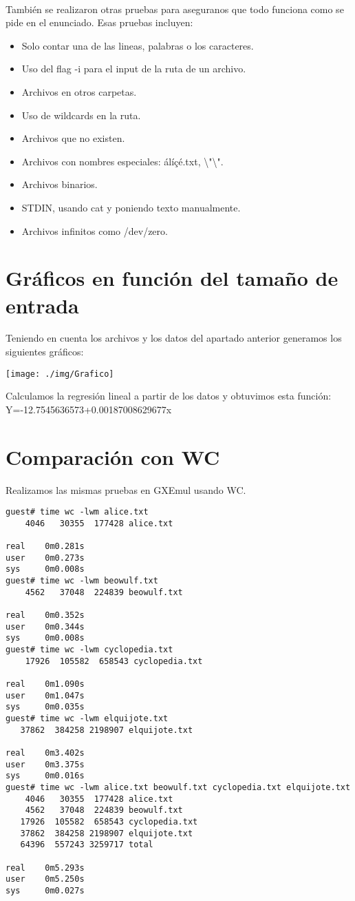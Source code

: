 \documentclass[a4paper]{article}
\begin{document}
\paragraph{}
También se realizaron otras pruebas para aseguranos que todo funciona como se pide en el enunciado. Esas pruebas incluyen:
\begin{itemize}
\item Solo contar una de las lineas, palabras o los caracteres.
\item Uso del flag -i para el input de la ruta de un archivo.
\item Archivos en otros carpetas.
\item Uso de wildcards en la ruta.
\item Archivos que no existen.
\item Archivos con nombres especiales: álíçé.txt, \textbackslash{}"\textbackslash{}".
\item Archivos binarios.
\item STDIN, usando cat y poniendo texto manualmente.
\item Archivos infinitos como /dev/zero.


\end{itemize}
\pagebreak
\section{Gráficos en función del tamaño de entrada}
Teniendo en cuenta los archivos y los datos del apartado anterior generamos los siguientes gráficos:

\texttt{[image: ./img/Grafico]}

Calculamos la regresión lineal a partir de los datos y obtuvimos esta función:  Y=-12.7545636573+0.00187008629677x

\pagebreak

\section{Comparación con WC}
Realizamos las mismas pruebas en GXEmul usando WC.

\begin{verbatim}
guest# time wc -lwm alice.txt
	4046   30355  177428 alice.txt

real    0m0.281s
user    0m0.273s
sys     0m0.008s
guest# time wc -lwm beowulf.txt
    4562   37048  224839 beowulf.txt

real    0m0.352s
user    0m0.344s
sys     0m0.008s
guest# time wc -lwm cyclopedia.txt
	17926  105582  658543 cyclopedia.txt

real    0m1.090s
user    0m1.047s
sys     0m0.035s
guest# time wc -lwm elquijote.txt
   37862  384258 2198907 elquijote.txt

real    0m3.402s
user    0m3.375s
sys     0m0.016s
guest# time wc -lwm alice.txt beowulf.txt cyclopedia.txt elquijote.txt
    4046   30355  177428 alice.txt
    4562   37048  224839 beowulf.txt
   17926  105582  658543 cyclopedia.txt
   37862  384258 2198907 elquijote.txt
   64396  557243 3259717 total

real    0m5.293s
user    0m5.250s
sys     0m0.027s
\end{verbatim}
\end{document}
